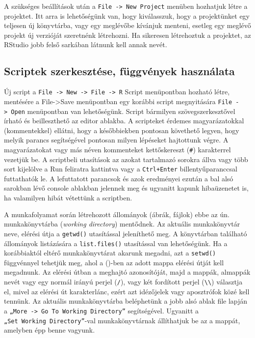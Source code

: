 \documentclass[
]{book}
\begin{document}
A szükséges beállítások után a
\texttt{File\ -\textgreater{}\ New\ Project} menüben hozhatjuk létre a
projektet. Itt arra is lehetőségünk van, hogy kiválasszuk, hogy a
projektünket egy teljesen új könyvtárba, vagy egy meglévőbe kívánjuk
menteni, esetleg egy meglévő projekt új verzióját szeretnénk létrehozni.
Ha sikeresen létrehoztuk a projektet, az RStudio jobb felső sarkában
látnunk kell annak nevét.

\hypertarget{scriptek-szerkesztuxe9se-fuxfcggvuxe9nyek-hasznuxe1lata}{%
\subsection{Scriptek szerkesztése, függvények
használata}\label{scriptek-szerkesztuxe9se-fuxfcggvuxe9nyek-hasznuxe1lata}}

Új script a
\texttt{File\ -\textgreater{}\ New\ -\textgreater{}\ File\ -\textgreater{}\ R}
Script menüpontban hozható létre, mentésére a File-\textgreater Save
menüpontban egy korábbi script megnyitására
\texttt{File\ -\textgreater{}\ Open} menüpontban van lehetőségünk.
Script bármilyen szövegszerkesztővel írható és beilleszthető az editor
ablakba. A scripteket érdemes magyarázatokkal (kommentekkel) ellátni,
hogy a későbbiekben pontosan követhető legyen, hogy melyik parancs
segítségével pontosan milyen lépéseket hajtottunk végre. A
magyarázatokat vagy más néven kommenteket kettőskereszt (\texttt{\#})
karakterrel vezetjük be. A scriptbeli utasítások az azokat tartalmazó
sorokra állva vagy több sort kijelölve a Run feliratra kattintva vagy a
\texttt{Ctrl+Enter} billentyűparanccsal futtathatók le. A lefuttatott
parancsok és azok eredményei ezután a bal alsó sarokban lévő console
ablakban jelennek meg és ugyanitt kapunk hibaüzenetet is, ha valamilyen
hibát vétettünk a scriptben.

A munkafolyamat során létrehozott állományok (ábrák, fájlok) ebbe az ún.
munkakönyvtárba (\emph{working directory}) mentődnek. Az aktuális
munkakönyvtár neve, elérési útja a \texttt{getwd()} utasítással
jeleníthető meg. A könyvtárban található állományok listázására a
\texttt{list.files()} utasítással van lehetőségünk. Ha a korábbiaktól
eltérő munkakönyvtárat akarunk megadni, azt a \texttt{setwd()}
függvénnyel tehetjük meg, ahol a ()-ben az adott mappa elérési útját
kell megadnunk. Az elérési útban a meghajtó azonosítóját, majd a mappák,
almappák nevét vagy egy normál irányú perjel (\texttt{/}), vagy két
fordított perjel (\texttt{\textbackslash{}\textbackslash{}}) választja
el, mivel az elérési út karakterlánc, ezért azt idézőjelek vagy
aposztrófok közé kell tennünk. Az aktuális munkakönyvtárba beléphetünk a
jobb alsó ablak file lapján a
\texttt{„More\ -\textgreater{}\ Go\ To\ Working\ Directory”}
segítségével. Ugyanitt a \texttt{„Set\ Working\ Directory”}-val
munkakönyvtárnak állíthatjuk be az a mappát, amelyben épp benne vagyunk.
\end{document}

